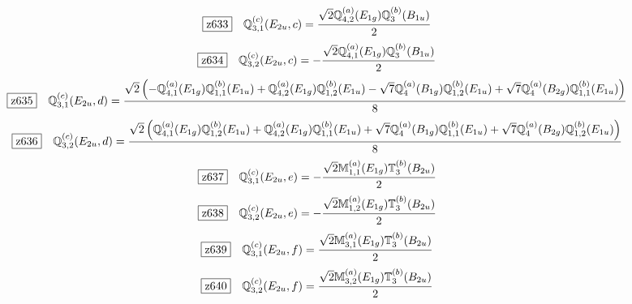 \documentclass[fleqn,10pt,landscape]{jsarticle}
\begin{document}
\begin{dmath*}
\hspace*{3mm}\fbox{z633}\quad \mathbb{Q}_{3,1}^{(c)}(E_{2u},c)=\frac{\sqrt{2} \mathbb{Q}_{4,2}^{(a)}(E_{1g}) \mathbb{Q}_{3}^{(b)}(B_{1u})}{2}
\end{dmath*}
\begin{dmath*}
\hspace*{3mm}\fbox{z634}\quad \mathbb{Q}_{3,2}^{(c)}(E_{2u},c)=- \frac{\sqrt{2} \mathbb{Q}_{4,1}^{(a)}(E_{1g}) \mathbb{Q}_{3}^{(b)}(B_{1u})}{2}
\end{dmath*}
\begin{dmath*}
\hspace*{3mm}\fbox{z635}\quad \mathbb{Q}_{3,1}^{(c)}(E_{2u},d)=\frac{\sqrt{2} \left(- \mathbb{Q}_{4,1}^{(a)}(E_{1g}) \mathbb{Q}_{1,1}^{(b)}(E_{1u}) + \mathbb{Q}_{4,2}^{(a)}(E_{1g}) \mathbb{Q}_{1,2}^{(b)}(E_{1u}) - \sqrt{7} \mathbb{Q}_{4}^{(a)}(B_{1g}) \mathbb{Q}_{1,2}^{(b)}(E_{1u}) + \sqrt{7} \mathbb{Q}_{4}^{(a)}(B_{2g}) \mathbb{Q}_{1,1}^{(b)}(E_{1u})\right)}{8}
\end{dmath*}
\begin{dmath*}
\hspace*{3mm}\fbox{z636}\quad \mathbb{Q}_{3,2}^{(c)}(E_{2u},d)=\frac{\sqrt{2} \left(\mathbb{Q}_{4,1}^{(a)}(E_{1g}) \mathbb{Q}_{1,2}^{(b)}(E_{1u}) + \mathbb{Q}_{4,2}^{(a)}(E_{1g}) \mathbb{Q}_{1,1}^{(b)}(E_{1u}) + \sqrt{7} \mathbb{Q}_{4}^{(a)}(B_{1g}) \mathbb{Q}_{1,1}^{(b)}(E_{1u}) + \sqrt{7} \mathbb{Q}_{4}^{(a)}(B_{2g}) \mathbb{Q}_{1,2}^{(b)}(E_{1u})\right)}{8}
\end{dmath*}
\begin{dmath*}
\hspace*{3mm}\fbox{z637}\quad \mathbb{Q}_{3,1}^{(c)}(E_{2u},e)=- \frac{\sqrt{2} \mathbb{M}_{1,1}^{(a)}(E_{1g}) \mathbb{T}_{3}^{(b)}(B_{2u})}{2}
\end{dmath*}
\begin{dmath*}
\hspace*{3mm}\fbox{z638}\quad \mathbb{Q}_{3,2}^{(c)}(E_{2u},e)=- \frac{\sqrt{2} \mathbb{M}_{1,2}^{(a)}(E_{1g}) \mathbb{T}_{3}^{(b)}(B_{2u})}{2}
\end{dmath*}
\begin{dmath*}
\hspace*{3mm}\fbox{z639}\quad \mathbb{Q}_{3,1}^{(c)}(E_{2u},f)=\frac{\sqrt{2} \mathbb{M}_{3,1}^{(a)}(E_{1g}) \mathbb{T}_{3}^{(b)}(B_{2u})}{2}
\end{dmath*}
\begin{dmath*}
\hspace*{3mm}\fbox{z640}\quad \mathbb{Q}_{3,2}^{(c)}(E_{2u},f)=\frac{\sqrt{2} \mathbb{M}_{3,2}^{(a)}(E_{1g}) \mathbb{T}_{3}^{(b)}(B_{2u})}{2}
\end{dmath*}
\end{document}
